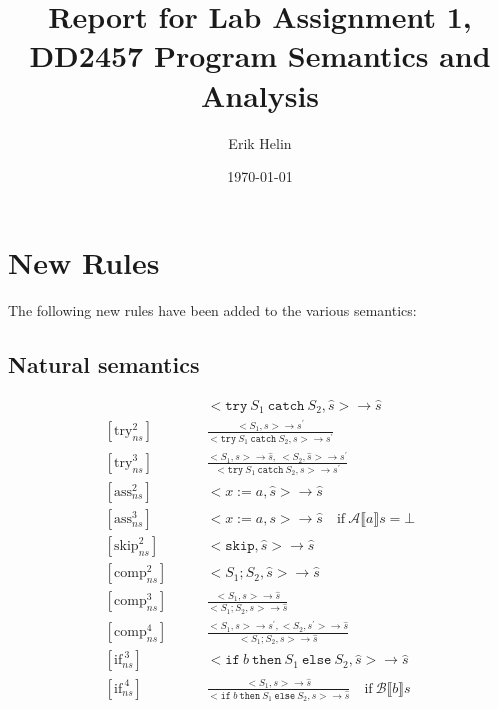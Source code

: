 \documentclass[11pt,oneside,a4paper]{article}
\begin{document}
\title{Report for Lab Assignment 1, DD2457 Program Semantics and Analysis}
\author{Erik Helin}
\date{\today}
\maketitle
\newpage

\section*{New Rules}
The following new rules have been added to the various semantics:
\subsection*{Natural semantics}
\begingroup
\addtolength{\jot}{.5em}
\begin{align*}
[\text{try}_{ns}^1] \quad \quad &
<\texttt{try}\: S_1 \: \texttt{catch}\: S_2, \hat{s}> \rightarrow \hat{s} \\
[\text{try}_{ns}^2] \quad \quad &
\frac{<S_1,s> \rightarrow s^{'}}
     {<\texttt{try}\: S_1 \: \texttt{catch} \: S_2, s> \rightarrow s^{'}}  \\
[\text{try}_{ns}^3] \quad \quad &
\frac{<S_1,s> \rightarrow \hat{s}, \: <S_2, \hat{s}> \rightarrow s^{'}}
     {<\texttt{try}\: S_1 \: \texttt{catch} \: S_2, s> \rightarrow s^{'}} \\
[\text{ass}_{ns}^2] \quad \quad &
<x := a, \hat{s}> \rightarrow \hat{s} \\
[\text{ass}_{ns}^3] \quad \quad &
<x := a, s> \rightarrow \hat{s} \quad 
\text{if} \: \mathcal{A} \llbracket a \rrbracket s = \bot \\
[\text{skip}_{ns}^2] \quad \quad &
<\texttt{skip}, \hat{s}> \rightarrow \hat{s} \\
[\text{comp}_{ns}^2] \quad \quad &
<S_1;S_2, \hat{s}> \rightarrow \hat{s} \\
[\text{comp}_{ns}^3] \quad \quad &
\frac{<S_1, s> \rightarrow \hat{s}}{<S_1;S_2, s> \rightarrow \hat{s}} \\
[\text{comp}_{ns}^4] \quad \quad &
\frac{<S_1, s> \rightarrow s^{'}, <S_2, s^{'}> \rightarrow \hat{s}}
{<S_1;S_2, s> \rightarrow \hat{s}} \\
[\text{if}_{ns}^{\:3}] \quad \quad & <\texttt{if}\:b\: \texttt{then}\:  S_1 \: 
\texttt{else} \: S_2, \hat{s}> \rightarrow \hat{s} \\
[\text{if}_{ns}^{\:4}] \quad \quad & \frac{<S_1, s> \rightarrow \hat{s}}
{ <\texttt{if}\:b\: \texttt{then}\:  S_1 \: \texttt{else} \: S_2, s> 
\rightarrow \hat{s}} \quad \text{if} \: \mathcal{B} \llbracket b \rrbracket s

\end{align*}
\end{document}
